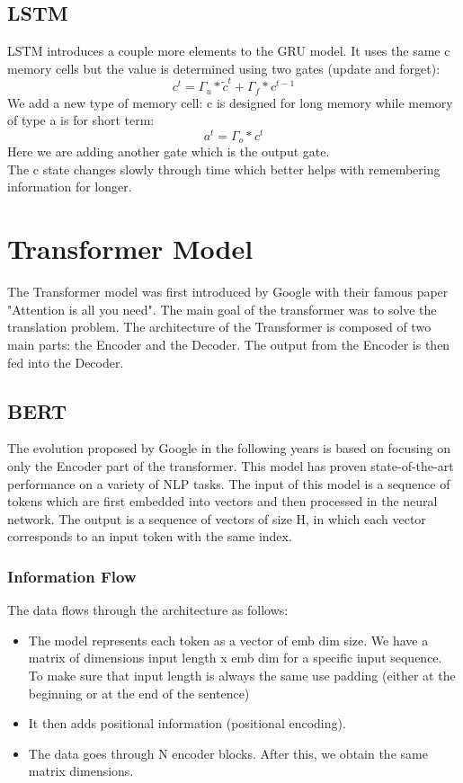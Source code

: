\documentclass{article}
\begin{document}
\subsection*{LSTM}
LSTM introduces a couple more elements to the GRU model. It uses the same c memory cells but the value is determined using two gates (update and forget):
\[ 
    c^t =\Gamma_u * \tilde{c}^t + \Gamma_f * c^{t-1}
\]
We add a new type of memory cell: c is designed for long memory while memory of type a is for short term:
\[ 
    a^t = \Gamma_o * c^t 
\]Here we are adding another gate which is the output gate.\\ The c state changes slowly through time which better helps with remembering information for longer.

\section{Transformer Model}
The Transformer model was first introduced by Google with their famous paper "Attention is all you need". The main goal of the transformer was to solve the translation problem. The architecture of the Transformer is composed of two main parts: the Encoder and the Decoder. The output from the Encoder is then fed into the Decoder.
\subsection*{BERT}
The evolution proposed by Google in the following years is based on focusing on only the Encoder part of the transformer. This model has proven state-of-the-art performance on a variety of NLP tasks. The input of this model is a sequence of tokens which are first embedded into vectors and then processed in the neural network. The output is a sequence of vectors of size H, in which each vector corresponds to an input token with the same index. 
\subsubsection*{Information Flow}
The data flows through the architecture as follows:
\begin{itemize}
    \item The model represents each token as a vector of emb dim size. We have a matrix of dimensions input length x emb dim for a specific input sequence. To make sure that input length is always the same use padding (either at the beginning or at the end of the sentence)
    \item It then adds positional information (positional encoding).
    \item The data goes through N encoder blocks. After this, we obtain the same matrix dimensions. 
\end{itemize}
\end{document}
